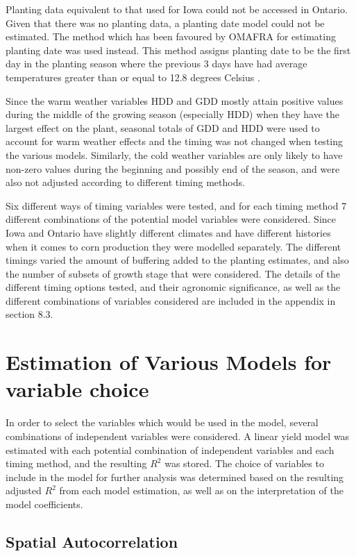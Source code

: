  Planting data equivalent to that used for Iowa could not be accessed in Ontario. Given that there was no planting data, a planting date model could not be estimated. The method which has been favoured by OMAFRA for estimating planting date was used instead. This method assigns planting date to be the first day in the planting season where the previous 3 days have had average temperatures greater than or equal to 12.8 degrees Celsius \citep{OMAFRAhybrid}.

Since the warm weather variables HDD and GDD mostly attain positive values during the middle of the growing season (especially HDD) when they have the largest effect on the plant, seasonal totals of GDD and HDD were used to account for warm weather effects and the timing was not changed when testing the various models. Similarly, the cold weather variables are only likely to have non-zero values during the beginning and possibly end of the season, and were also not adjusted according to different timing methods.

Six different ways of timing variables were tested, and for each timing method 7 different combinations of the potential model variables were considered. Since Iowa and Ontario have slightly different climates and have different histories when it comes to corn production they were modelled separately. The different timings varied the amount of buffering added to the planting estimates, and also the number of subsets of growth stage that were considered. The details of the different timing options tested, and their agronomic significance, as well as the different combinations of variables considered are included in the  appendix in section 8.3.


\section{Estimation of Various Models for variable choice}

In order to select the variables which would be used in the model, several combinations of independent variables were considered. A linear yield model was estimated with each potential combination of independent variables and each timing method, and the resulting $R^2$ was stored. The choice of variables to include in the model for further analysis was determined based on the resulting adjusted $R^2$ from each model estimation, as well as on the interpretation of the model coefficients.

\subsection{Spatial Autocorrelation}

